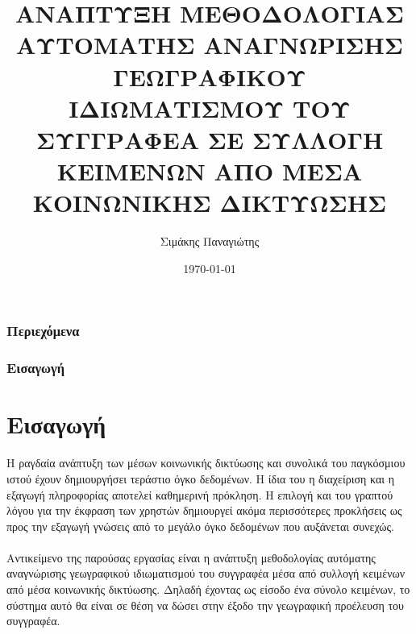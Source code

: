 \documentclass{beamer}
\title[Γεωγραφική Αναγνώριση Συγγραφέα]{ΑΝΑΠΤΥΞΗ ΜΕΘΟΔΟΛΟΓΙΑΣ ΑΥΤΟΜΑΤΗΣ ΑΝΑΓΝΩΡΙΣΗΣ ΓΕΩΓΡΑΦΙΚΟΥ ΙΔΙΩΜΑΤΙΣΜΟΥ ΤΟΥ ΣΥΓΓΡΑΦΕΑ ΣΕ ΣΥΛΛΟΓΗ ΚΕΙΜΕΝΩΝ ΑΠΟ ΜΕΣΑ ΚΟΙΝΩΝΙΚΗΣ ΔΙΚΤΥΩΣΗΣ } %
\author{Σιμάκης Παναγιώτης} %
\institute[\selectlanguage{english}CEID] %
{
Πανεπιστήμιο Πατρών \\ Πολυτεχνική Σχολή \\ Τμήμα Μηχανικών Ηλεκτρονικών Υπολογιστών και Πληροφορικής \\ %
\medskip
\textit{\selectlanguage{english}simakis@ceid.upatras.gr} %
}
\date{\today} %
\begin{document}
\begin{frame}
	\titlepage %
\end{frame}






\begin{frame}
		\frametitle{Περιεχόμενα}
		\tableofcontents %
\end{frame}

\begin{frame}
	\frametitle{Εισαγωγή}
	\section{Εισαγωγή}
	Η ραγδαία ανάπτυξη των μέσων κοινωνικής δικτύωσης και συνολικά του παγκόσμιου ιστού έχουν δημιουργήσει τεράστιο όγκο δεδομένων. Η ίδια του η διαχείριση και η εξαγωγή πληροφορίας αποτελεί καθημερινή πρόκληση. Η επιλογή και του γραπτού λόγου για την έκφραση των χρηστών δημιουργεί ακόμα περισσότερες προκλήσεις ως προς την εξαγωγή γνώσεις από το μεγάλο όγκο δεδομένων που αυξάνεται συνεχώς.\\~\\
	Αντικείμενο της παρούσας εργασίας είναι η ανάπτυξη μεθοδολογίας αυτόματης αναγνώρισης γεωγραφικού ιδιωματισμού του συγγραφέα μέσα από συλλογή κειμένων από μέσα κοινωνικής δικτύωσης. Δηλαδή έχοντας ως είσοδο ένα σύνολο κειμένων, το σύστημα αυτό θα είναι σε θέση να δώσει στην έξοδο την γεωγραφική προέλευση του συγγραφέα.
\end{frame}
\end{document}
